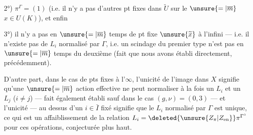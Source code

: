 2°) $\pi^\Gamma=(1)$ (i.e. il n'y a pas d'autres pt fixes dans $\widetilde U$ sur le $\unsure{=|\overline m}$ $x\in U(K)$), et enfin

3°) il n'y a pas en $\unsure{=|\overline m}$ temps de pt fixe $\unsure{\widetilde x}$ à l'infini --- i.e. il n'existe pas de $L_i$ normalisé par $\Gamma$, i.e. un scindage du premier type n'est pas en $\unsure{=|\overline m}$ temps du deuxième (fait que nous avons établi directement, précédemment).


D'autre part, dans le cas de pts fixes à l'$\infty$, l'unicité de l'image dans $X$ signifie qu'une $\unsure{=|\overline m}$ action effective ne peut normaliser à la fois un $L_i$ et un $L_j$ ($i\ne j$) --- fait également établi sauf dans le cas $(g,\nu)=(0,3)$ --- et l'unicité --- au dessus d'un $i\in\bar I$ fixé signifie que le $L_i$  normalisé par $\Gamma$ est unique, ce qui est un affaiblissement de la relation $L_i=\deleted{\unsure{Z_\pi|Z_{\mathrm{en}}}}\pi^{\Gamma^\circ}$ pour ces opérations, conjecturée plus haut.
